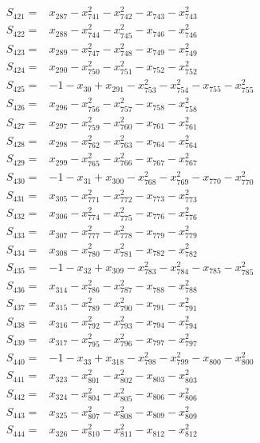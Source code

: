 \begin{align*}
S_{421}={}&x_{287}-x_{741}^{2}-x_{742}^{2}-x_{743}-x_{743}^{2}\\[3pt]
S_{422}={}&x_{288}-x_{744}^{2}-x_{745}^{2}-x_{746}-x_{746}^{2}\\[3pt]
S_{423}={}&x_{289}-x_{747}^{2}-x_{748}^{2}-x_{749}-x_{749}^{2}\\[3pt]
S_{424}={}&x_{290}-x_{750}^{2}-x_{751}^{2}-x_{752}-x_{752}^{2}\\[3pt]
S_{425}={}&-1-x_{30}+x_{291}-x_{753}^{2}-x_{754}^{2}-x_{755}-x_{755}^{2}\\[3pt]
S_{426}={}&x_{296}-x_{756}^{2}-x_{757}^{2}-x_{758}-x_{758}^{2}\\[3pt]
S_{427}={}&x_{297}-x_{759}^{2}-x_{760}^{2}-x_{761}-x_{761}^{2}\\[3pt]
S_{428}={}&x_{298}-x_{762}^{2}-x_{763}^{2}-x_{764}-x_{764}^{2}\\[3pt]
S_{429}={}&x_{299}-x_{765}^{2}-x_{766}^{2}-x_{767}-x_{767}^{2}\\[3pt]
S_{430}={}&-1-x_{31}+x_{300}-x_{768}^{2}-x_{769}^{2}-x_{770}-x_{770}^{2}\\[3pt]
S_{431}={}&x_{305}-x_{771}^{2}-x_{772}^{2}-x_{773}-x_{773}^{2}\\[3pt]
S_{432}={}&x_{306}-x_{774}^{2}-x_{775}^{2}-x_{776}-x_{776}^{2}\\[3pt]
S_{433}={}&x_{307}-x_{777}^{2}-x_{778}^{2}-x_{779}-x_{779}^{2}\\[3pt]
S_{434}={}&x_{308}-x_{780}^{2}-x_{781}^{2}-x_{782}-x_{782}^{2}\\[3pt]
S_{435}={}&-1-x_{32}+x_{309}-x_{783}^{2}-x_{784}^{2}-x_{785}-x_{785}^{2}\\[3pt]
S_{436}={}&x_{314}-x_{786}^{2}-x_{787}^{2}-x_{788}-x_{788}^{2}\\[3pt]
S_{437}={}&x_{315}-x_{789}^{2}-x_{790}^{2}-x_{791}-x_{791}^{2}\\[3pt]
S_{438}={}&x_{316}-x_{792}^{2}-x_{793}^{2}-x_{794}-x_{794}^{2}\\[3pt]
S_{439}={}&x_{317}-x_{795}^{2}-x_{796}^{2}-x_{797}-x_{797}^{2}\\[3pt]
S_{440}={}&-1-x_{33}+x_{318}-x_{798}^{2}-x_{799}^{2}-x_{800}-x_{800}^{2}\\[3pt]
S_{441}={}&x_{323}-x_{801}^{2}-x_{802}^{2}-x_{803}-x_{803}^{2}\\[3pt]
S_{442}={}&x_{324}-x_{804}^{2}-x_{805}^{2}-x_{806}-x_{806}^{2}\\[3pt]
S_{443}={}&x_{325}-x_{807}^{2}-x_{808}^{2}-x_{809}-x_{809}^{2}\\[3pt]
S_{444}={}&x_{326}-x_{810}^{2}-x_{811}^{2}-x_{812}-x_{812}^{2}\\[3pt]

\end{align*}
